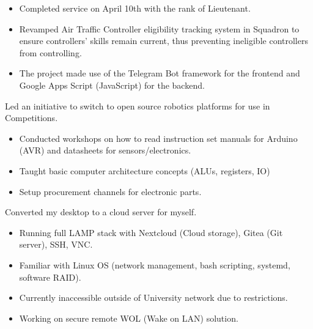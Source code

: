\documentclass[10pt,a4paper,ragged2e,withhyper]{altacv}
\begin{document}
\begin{paracol}{2}
\begin{itemize}
\item Completed service on April 10th with the rank of Lieutenant.
\end{itemize}

\divider


\newpage


\begin{itemize}
\item Revamped Air Traffic Controller eligibility tracking system in Squadron to ensure controllers’ skills remain current, thus preventing ineligible controllers from controlling. 
\item The project made use of the Telegram Bot framework for the frontend and Google Apps Script (JavaScript) for the backend.
\end{itemize}

\divider

Led an initiative to switch to open source robotics platforms for use in Competitions. 
\medskip
\begin{itemize}
  \item Conducted workshops on how to read instruction set manuals for Arduino (AVR) and datasheets for sensors/electronics.
  \item Taught basic computer architecture concepts (ALUs, registers, IO)
  \item Setup procurement channels for electronic parts.
\end{itemize}

\divider

Converted my desktop to a cloud server for myself. 
\medskip
\begin{itemize}
  \item Running full LAMP stack with Nextcloud (Cloud storage), Gitea (Git server), SSH, VNC.
  \item Familiar with Linux OS (network management, bash scripting, systemd, software RAID).
  \item Currently inaccessible outside of University network due to restrictions.
  \item Working on secure remote WOL (Wake on LAN) solution.
\end{itemize}


\end{paracol}
\end{document}
